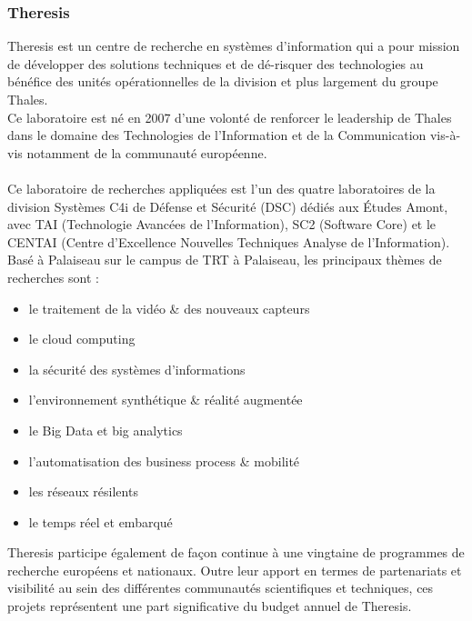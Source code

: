 \documentclass[12pt]{article}
\begin{document}
\subsubsection{Theresis}
Theresis est un centre de recherche en systèmes d'information qui a pour mission de développer des solutions techniques et de dé-risquer des technologies au bénéfice des unités opérationnelles de la division et plus largement du groupe Thales.\\
Ce laboratoire est né en 2007 d'une volonté de renforcer le leadership de Thales dans le domaine des Technologies de l'Information et de la Communication vis-à-vis notamment de la communauté européenne.\\
\\
Ce laboratoire de recherches appliquées est l’un des quatre laboratoires de la division Systèmes C4i de Défense et Sécurité (DSC) dédiés aux Études Amont, avec TAI (Technologie Avancées de l’Information), SC2 (Software Core) et le CENTAI (Centre d’Excellence Nouvelles Techniques Analyse de l’Information).\\
Basé à Palaiseau sur le campus de TRT à Palaiseau, les principaux thèmes de recherches sont :
\begin{itemize}
\item le traitement de la vidéo \& des nouveaux capteurs
\item le cloud computing
\item la sécurité des systèmes d'informations
\item l'environnement synthétique \& réalité augmentée
\item le Big Data et big analytics
\item l'automatisation des business process \& mobilité
\item les réseaux résilents
\item le temps réel et embarqué
\end{itemize}

Theresis participe également de façon continue à une vingtaine de programmes de recherche européens et nationaux. Outre leur apport en termes de partenariats et visibilité au sein des différentes communautés scientifiques et techniques, ces projets représentent une part significative du budget annuel de Theresis.
\end{document}
